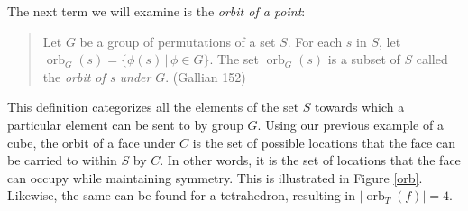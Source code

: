\documentclass[11pt,twoside]{article}
\begin{document}
The next term we will examine is the \emph{orbit of a point}:
\begin{quote}
Let $G$ be a group of permutations of a set $S$.  For each $s$ in $S$, let $\operatorname{orb}_G(s) = \{ \phi(s)\, | \, \phi \in G \}$.  The set $\operatorname{orb}_G(s)$ is a subset of $S$ called the \emph{orbit of s under} $G$. (Gallian 152)
\end{quote}
This definition categorizes all the elements of the set $S$ towards which a particular element can be sent to by group $G$.  Using our previous example of a cube, the orbit of a face under $C$ is the set of possible locations that the face can be carried to within $S$ by $C$.  In other words, it is the set of locations that the face can occupy while maintaining symmetry.  This is illustrated in Figure \ref{orb}.  Likewise, the same can be found for a tetrahedron, resulting in $|\operatorname{orb}_{T}(f)| = 4$.
\end{document}
